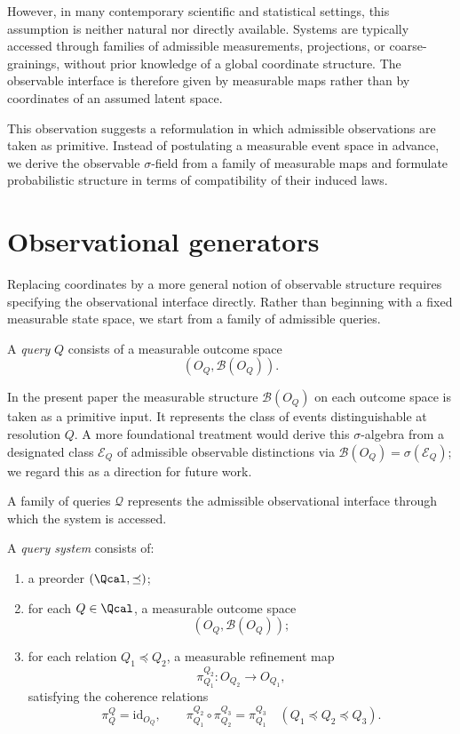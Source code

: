However, in many contemporary scientific and statistical settings, this assumption is neither natural nor directly available. Systems are typically accessed through families of admissible measurements, projections, or coarse-grainings, without prior knowledge of a global coordinate structure. The observable interface is therefore given by measurable maps rather than by coordinates of an assumed latent space.

This observation suggests a reformulation in which admissible observations are taken as primitive. Instead of postulating a measurable event space in advance, we derive the observable $\sigma$-field from a family of measurable maps and formulate probabilistic structure in terms of compatibility of their induced laws.

\section{Observational generators}

Replacing coordinates by a more general notion of observable structure
requires specifying the observational interface directly.
Rather than beginning with a fixed measurable state space,
we start from a family of admissible queries.

\begin{definition}[Query]
\label{def:query}
A \emph{query} $Q$ consists of a measurable outcome space
\[
(O_Q,\mathcal B(O_Q)).
\]
\end{definition}

\begin{remark}
In the present paper the measurable structure $\mathcal B(O_Q)$ on
each outcome space is taken as a primitive input. It represents the
class of events distinguishable at resolution $Q$. A more foundational
treatment would derive this $\sigma$-algebra from a designated class
$\mathcal E_Q$ of admissible observable distinctions via
$\mathcal B(O_Q) = \sigma(\mathcal E_Q)$; we regard this as a
direction for future work.
\end{remark}

A family of queries $\mathcal Q$ represents the admissible observational
interface through which the system is accessed.

\begin{definition}
\label{def:query-system}
A \emph{query system} consists of:
\begin{enumerate}
\item a preorder $(\Qcal,\preceq)$;
\item for each $Q\in\Qcal$, a measurable outcome space
\[
(O_Q,\mathcal B(O_Q));
\]
\item for each relation $Q_1\preceq Q_2$, a measurable refinement map
\[
\pi^{Q_2}_{Q_1}:O_{Q_2}\to O_{Q_1},
\]
satisfying the coherence relations
\[
\pi^Q_Q=\mathrm{id}_{O_Q},
\qquad
\pi^{Q_2}_{Q_1}\circ\pi^{Q_3}_{Q_2}=\pi^{Q_3}_{Q_1}
\quad
(Q_1\preceq Q_2\preceq Q_3).
\]
\end{enumerate}
\end{definition}

